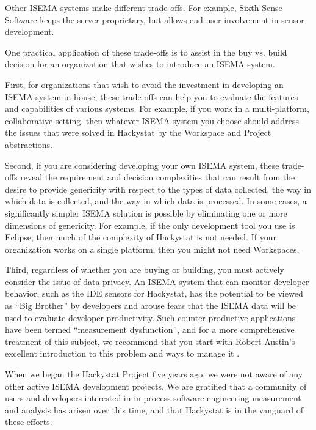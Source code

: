 \documentclass[10pt,twocolumn]{article}
\begin{document}
Other ISEMA systems make different trade-offs. For example, Sixth Sense
Software keeps the server proprietary, but allows end-user involvement in
sensor development.


One practical application of these trade-offs is to assist in the buy
vs. build decision for an organization that wishes to introduce an ISEMA
system.

First, for organizations that wish to avoid the investment in developing an
ISEMA system in-house, these trade-offs can help you to evaluate the
features and capabilities of various systems.  For example, if you work in
a multi-platform, collaborative setting, then whatever ISEMA system you
choose should address the issues that were solved in Hackystat by the
Workspace and Project abstractions.

Second, if you are considering developing your own ISEMA system, these
trade-offs reveal the requirement and decision complexities that can result
from the desire to provide genericity with respect to the types of data
collected, the way in which data is collected, and the way in which data is
processed.  In some cases, a significantly simpler ISEMA solution is
possible by eliminating one or more dimensions of genericity.  For example,
if the only development tool you use is Eclipse, then much of the
complexity of Hackystat is not needed.  If your organization works on a
single platform, then you might not need Workspaces.

Third, regardless of whether you are buying or building, you must actively
consider the issue of data privacy.  An ISEMA system that can monitor
developer behavior, such as the IDE sensors for Hackystat, has the
potential to be viewed as ``Big Brother'' by developers and arouse fears
that the ISEMA data will be used to evaluate developer productivity.  Such
counter-productive applications have been termed ``measurement
dysfunction'', and for a more comprehensive treatment of this subject, we
recommend that you start with Robert Austin's excellent introduction to
this problem and ways to manage it \cite{Austen??}.


When we began the Hackystat Project five years ago, we were not aware of any other 
active ISEMA development projects.  We are gratified that a community of users and
developers interested in in-process software engineering measurement and analysis 
has arisen over this time, and that Hackystat is in the vanguard of these efforts. 
\end{document}
